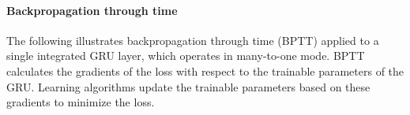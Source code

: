 \paragraph*{Backpropagation through time}$\ $\\
The following illustrates backpropagation through time (BPTT) 
applied to a single integrated GRU layer, 
which operates in many-to-one mode. 
BPTT calculates the gradients of the loss with respect to the 
trainable parameters of the GRU. 
Learning algorithms update the trainable parameters 
based on these gradients to minimize the loss.









